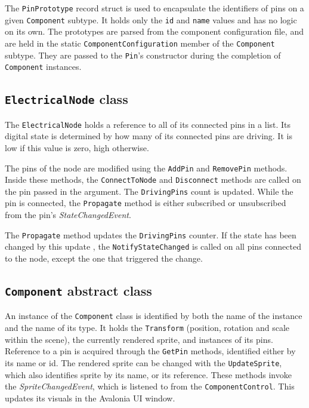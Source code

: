 The \texttt{PinPrototype} record struct is used to encapsulate the identifiers of pins on a given \texttt{Component} subtype. It holds only the \texttt{id} and \texttt{name} values and has no logic on its own. The prototypes are parsed from the component configuration file, and are held in the static \texttt{ComponentConfiguration} member of the \texttt{Component} subtype. They are passed to the \texttt{Pin}'s constructor during the completion of \texttt{Component} instances.

\subsection{\texttt{ElectricalNode} class}

The \texttt{ElectricalNode} holds a reference to all of its connected pins in a list. Its digital state is determined by how many of its connected pins are driving. It is low if this value is zero, high otherwise.

The pins of the node are modified using the \texttt{AddPin} and \texttt{RemovePin} methods. Inside these methods, the \texttt{ConnectToNode} and \texttt{Disconnect} methods are called on the pin passed in the argument. The \texttt{DrivingPins} count is updated. While the pin is connected, the \texttt{Propagate} method is either subscribed or unsubscribed from the pin's \textit{StateChangedEvent}.

The \texttt{Propagate} method updates the \texttt{DrivingPins} counter. If the state has been changed by this update \footnotemark, the \texttt{NotifyStateChanged} is called on all pins connected to the node, except the one that triggered the change. 


\subsection{\texttt{Component} abstract class}

An instance of the \texttt{Component} class is identified by both the name of the instance and the name of its type. It holds the \texttt{Transform} (position, rotation and scale within the scene), the currently rendered sprite, and instances of its pins. Reference to a pin is acquired through the \texttt{GetPin} methods, identified either by its name or id. The rendered sprite can be changed with the \texttt{UpdateSprite}, which also identifies sprite by its name, or its reference. These methods invoke the \textit{SpriteChangedEvent}, which is listened to from the \texttt{ComponentControl}. This updates its visuals in the Avalonia UI window.

